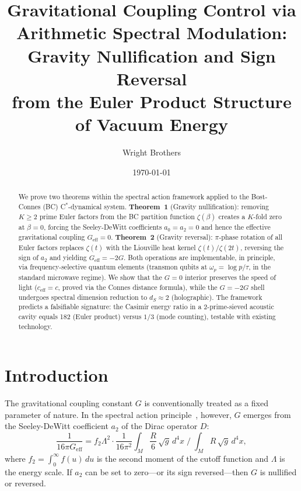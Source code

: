 \documentclass[aps,prd,twocolumn,superscriptaddress,nofootinbib]{revtex4-2}
\begin{document}
\title{Gravitational Coupling Control via Arithmetic Spectral Modulation:\\
Gravity Nullification and Sign Reversal\\
from the Euler Product Structure of Vacuum Energy}

\author{Wright Brothers}
\date{\today}

\begin{abstract}
We prove two theorems within the spectral action framework
applied to the Bost-Connes (BC) C$^*$-dynamical system.
\textbf{Theorem~1} (Gravity nullification):
removing $K \geq 2$ prime Euler factors from the BC partition function
$\zeta(\beta)$ creates a $K$-fold zero at $\beta = 0$,
forcing the Seeley-DeWitt coefficients $a_0 = a_2 = 0$
and hence the effective gravitational coupling $G_{\mathrm{eff}} = 0$.
\textbf{Theorem~2} (Gravity reversal):
$\pi$-phase rotation of all Euler factors replaces $\zeta(t)$ with
the Liouville heat kernel $\zeta(t)/\zeta(2t)$,
reversing the sign of $a_2$ and yielding $G_{\mathrm{eff}} = -2G$.
Both operations are implementable, in principle, via frequency-selective
quantum elements (transmon qubits at $\omega_p = \log p / \tau$,
in the standard microwave regime).
We show that the $G = 0$ interior preserves the speed of light
($c_{\mathrm{eff}} = c$, proved via the Connes distance formula),
while the $G = -2G$ shell undergoes spectral dimension reduction
to $d_S \approx 2$ (holographic).
The framework predicts a falsifiable signature:
the Casimir energy ratio in a 2-prime-sieved acoustic cavity
equals 182 (Euler product) versus $1/3$ (mode counting),
testable with existing technology.
\end{abstract}

\maketitle

\section{Introduction}

The gravitational coupling constant $G$ is conventionally treated as a
fixed parameter of nature.  In the spectral action
principle~\cite{Chamseddine1996,Connes2006}, however, $G$ emerges
from the Seeley-DeWitt coefficient $a_2$ of the Dirac operator $D$:
\begin{equation}
  \frac{1}{16\pi G_{\mathrm{eff}}} = f_2 \Lambda^2 \cdot
  \frac{1}{16\pi^2}\int_M \frac{R}{6}\,\sqrt{g}\,d^4x \;\Big/\;
  \int_M R\,\sqrt{g}\,d^4x,
  \label{eq:G_from_a2}
\end{equation}
where $f_2 = \int_0^\infty f(u)\,du$ is the second moment of the
cutoff function and $\Lambda$ is the energy scale.
If $a_2$ can be set to zero---or its sign reversed---then $G$
is nullified or reversed.
\end{document}
